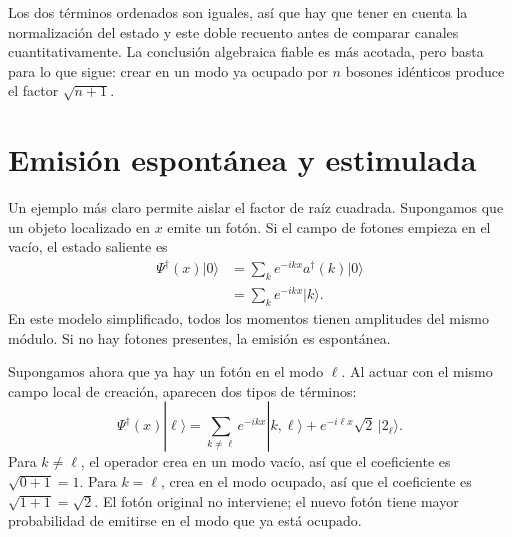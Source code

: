 Los dos términos ordenados son iguales, así que hay que tener en cuenta la normalización del estado y este doble recuento antes de comparar canales cuantitativamente. La conclusión algebraica fiable es más acotada, pero basta para lo que sigue: crear en un modo ya ocupado por \(n\) bosones idénticos produce el factor \(\sqrt{n+1}\).

\section{Emisión espontánea y estimulada}

Un ejemplo más claro permite aislar el factor de raíz cuadrada. Supongamos que un objeto localizado en \(x\) emite un fotón. Si el campo de fotones empieza en el vacío, el estado saliente es
\begin{align}
\Psi^\dagger(x)|0\rangle
&=\sum_k e^{-ikx}a^\dagger(k)|0\rangle\\
&=\sum_k e^{-ikx}|k\rangle.
\end{align}
En este modelo simplificado, todos los momentos tienen amplitudes del mismo módulo. Si no hay fotones presentes, la emisión es espontánea.

Supongamos ahora que ya hay un fotón en el modo \(\ell\). Al actuar con el mismo campo local de creación, aparecen dos tipos de términos:
\begin{equation}
\Psi^\dagger(x)|\ell\rangle
=
\sum_{k\ne\ell}e^{-ikx}|k,\ell\rangle
+e^{-i\ell x}\sqrt{2}\,|2_\ell\rangle.
\end{equation}
Para \(k\ne\ell\), el operador crea en un modo vacío, así que el coeficiente es \(\sqrt{0+1}=1\). Para \(k=\ell\), crea en el modo ocupado, así que el coeficiente es \(\sqrt{1+1}=\sqrt{2}\). El fotón original no interviene; el nuevo fotón tiene mayor probabilidad de emitirse en el modo que ya está ocupado.

\begin{classroomqa}
\end{classroomqa}


